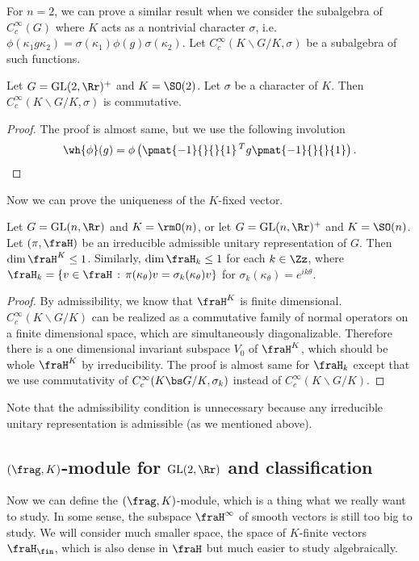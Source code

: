 For $n = 2$, we can prove a similar result when we consider the subalgebra of $C_{c}^{\infty}(G)$ where $K$ acts as a nontrivial character $\sigma$, i.e. $\phi(\kappa_{1} g\kappa_{2}) = \sigma(\kappa_{1}) \phi(g) \sigma(\kappa_{2})$. Let $C_{c}^{\infty}(K\backslash G/K, \sigma)$ be a subalgebra of such functions. 
\begin{proposition}
\label{commchar}
Let $G = \GL(2, \Rr)^{+}$ and $K = \SO(2)$. Let $\sigma$ be a character of $K$. Then $C_{c}^{\infty}(K\backslash G / K, \sigma)$ is commutative. 
\end{proposition}
\begin{proof}
The proof is almost same, but we use the following involution
$$
\wh{\phi}(g) = \phi\left(\pmat{-1}{}{}{1} \pre{T}{}g \pmat{-1}{}{}{1}\right). 
$$
\end{proof}

Now we can prove the uniqueness of the $K$-fixed vector. 
\begin{theorem}
\label{mult1char}
Let $G = \GL(n, \Rr)$ and $K = \rmO(n)$, or let $G = \GL(n, \Rr)^{+}$ and $K =\SO(n)$. Let $(\pi, \fraH)$ be an irreducible admissible unitary representation of $G$. Then $\dim \fraH^{K} \leq 1$. 
Similarly, $\dim \fraH_{k} \leq 1$ for each $k\in \Zz$, where $\fraH_{k} = \{v\in \fraH\,:\, \pi(\kappa_{\theta})v = \sigma_{k}(\kappa_{\theta})v\}$ for $\sigma_{k}(\kappa_{\theta}) = e^{ik\theta}$. 
\end{theorem}
\begin{proof}
By admissibility, we know that $\fraH^{K}$ is finite dimensional. $C_{c}^{\infty}(K\backslash G/K)$ can be realized as a commutative family of normal operators on a finite dimensional space, which are simultaneously diagonalizable. Therefore there is a one dimensional invariant subspace $V_{0}$ of $\fraH^{K}$, which should be whole $\fraH^{K}$ by irreducibility. 
The proof is almost same for $\fraH_{k}$ except that we use commutativity of $C_{c}^{\infty}(K\bs G/K, \sigma_{k})$ instead of $C_{c}^{\infty}(K\backslash G/K)$.
\end{proof}
Note that the admissibility condition is unnecessary because any irreducible unitary representation is admissible (as we mentioned above). 


\subsection{$(\frag, K)$-module for $\GL(2, \Rr)$ and classification}
Now we can define the $(\frag, K)$-module, which is a thing what we really want to study. In some sense, the subspace $\fraH^{\infty}$ of smooth vectors is still too big to study. We will consider much smaller space, the space of $K$-finite vectors $\fraH_{\fin}$, which is also dense in $\fraH$ but much easier to study algebraically. 

